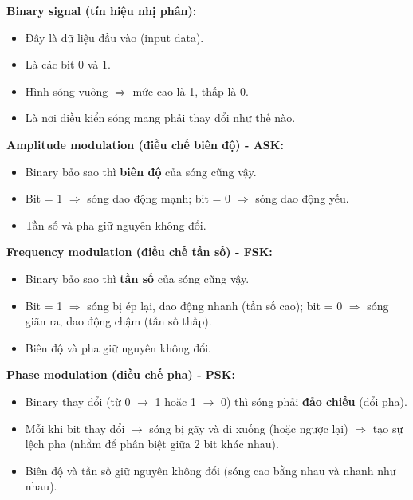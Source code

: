 \vspace{0.5cm}

\noindent
\textbf{Binary signal (tín hiệu nhị phân):}

\begin{itemize}
    \item[$\rightarrow$] Đây là dữ liệu đầu vào (input data).
    \item[$\rightarrow$] Là các bit 0 và 1.
    \item[$\rightarrow$] Hình sóng vuông $\Rightarrow$ mức cao là 1, thấp là 0.
    \item[$\rightarrow$] Là nơi điều kiển sóng mang phải thay đổi như thế nào.
\end{itemize}
\medskip

\noindent
\textbf{Amplitude modulation (điều chế biên độ) - ASK:}

\begin{itemize}
    \item[$\rightarrow$] Binary bảo sao thì \textbf{biên độ} của sóng cũng vậy.
    \item[$\rightarrow$] Bit = 1 $\Rightarrow$ sóng dao động mạnh; bit = 0 $\Rightarrow$ sóng dao động yếu.
    \item[$\rightarrow$] Tần số và pha giữ nguyên không đổi.
\end{itemize}
\medskip

\noindent
\textbf{Frequency modulation (điều chế tần số) - FSK:}

\begin{itemize}
    \item[$\rightarrow$] Binary bảo sao thì \textbf{tần số} của sóng cũng vậy.
    \item[$\rightarrow$] Bit = 1 $\Rightarrow$ sóng bị ép lại, dao động nhanh (tần số cao); bit = 0 $\Rightarrow$ sóng giãn ra, dao động chậm (tần số thấp).
    \item[$\rightarrow$] Biên độ và pha giữ nguyên không đổi.
\end{itemize}
\medskip

\noindent
\textbf{Phase modulation (điều chế pha) - PSK:}

\begin{itemize}
    \item[$\rightarrow$] Binary thay đổi (từ 0 $\rightarrow$ 1 hoặc 1 $\rightarrow$ 0) thì sóng phải \textbf{đảo chiều} (đổi pha).
    \item[$\rightarrow$] Mỗi khi bit thay đổi $\rightarrow$ sóng bị gãy và đi xuống (hoặc ngược lại) $\Rightarrow$ tạo sự lệch pha (nhằm để phân biệt giữa 2 bit khác nhau).
    \item[$\rightarrow$] Biên độ và tần số giữ nguyên không đổi (sóng cao bằng nhau và nhanh như nhau).
\end{itemize}
\medskip

